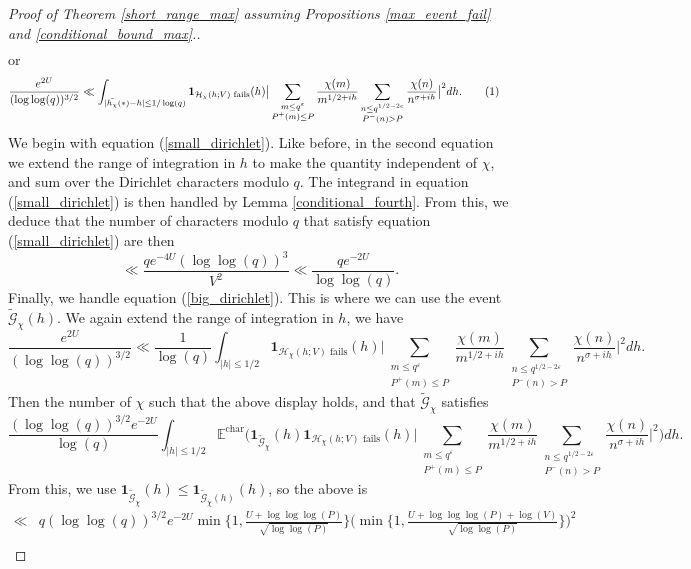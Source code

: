 \documentclass[reqno]{amsart}
\theoremstyle{definition}
\theoremstyle{remark}
\numberwithin{equation}{section}
\newcommand\numberthis{\addtocounter{equation}{1}\tag{\theequation}}
\theoremstyle{remark}
\begin{document}
\begin{proof}[Proof of Theorem \ref{short_range_max} assuming Propositions \ref{max_event_fail} and \ref{conditional_bound_max}.]
\begin{align*}
    \end{align*}
    or
    \begin{align*}
        &\frac{e^{2U}}{(\log\log(q))^{3/2}} \ll \int_{|\tilde{h_\chi}(*)-h| \leq 1/\log(q)}\mathbf{1}_{\mathcal{H}_\chi(h;V) \text{ fails}}(h)\big|\sum_{\substack{m \leq q^\varepsilon \\ P^+(m) \leq P}}\frac{\chi(m)}{m^{1/2+ih}}\sum_{\substack{n \leq q^{1/2-2\varepsilon} \\ P^{-}(n) > P}}\frac{\chi(n)}{n^{\sigma+ih}}\big|^2dh. \numberthis \label{big_dirichlet}
    \end{align*}
    We begin with equation (\ref{small_dirichlet}). Like before, in the second equation we extend the range of integration in $h$ to make the quantity independent of $\chi$, and sum over the Dirichlet characters modulo $q$. The integrand in equation (\ref{small_dirichlet}) is then handled by Lemma \ref{conditional_fourth}. From this, we deduce that the number of characters modulo $q$ that satisfy equation (\ref{small_dirichlet}) are then
    $$\ll \frac{qe^{-4U}(\log\log(q))^3}{V^2} \ll \frac{qe^{-2U}}{\log\log(q)}.$$
    Finally, we handle equation (\ref{big_dirichlet}). This is where we can use the event $\widetilde{\mathcal{G}}_\chi(h)$. We again extend the range of integration in $h$, we have
    $$\frac{e^{2U}}{(\log\log(q))^{3/2}} \ll \frac{1}{\log(q)}\int_{|h| \leq 1/2}\mathbf{1}_{\mathcal{H}_\chi(h;V) \text{ fails}}(h)\big|\sum_{\substack{m \leq q^\varepsilon \\ P^+(m) \leq P}}\frac{\chi(m)}{m^{1/2+ih}}\sum_{\substack{n \leq q^{1/2-2\varepsilon} \\ P^{-}(n) > P}}\frac{\chi(n)}{n^{\sigma+ih}}\big|^2dh.$$
    Then the number of $\chi$ such that the above display holds, and that $\widetilde{\mathcal{G}}_\chi$ satisfies
    $$\frac{(\log\log(q))^{3/2}e^{-2U}}{\log(q)}\int_{|h| \leq 1/2}\mathbb{E}^{\text{char}}\big(\mathbf{1}_{\widetilde{\mathcal{G}}_\chi}(h)\mathbf{1}_{\mathcal{H}_\chi(h;V) \text{ fails}}(h)\big|\sum_{\substack{m \leq q^\varepsilon \\ P^+(m) \leq P}}\frac{\chi(m)}{m^{1/2+ih}}\sum_{\substack{n \leq q^{1/2-2\varepsilon} \\ P^{-}(n) > P}}\frac{\chi(n)}{n^{\sigma+ih}}\big|^2\big)dh.$$
    From this, we use $\mathbf{1}_{\widetilde{\mathcal{G}}_\chi}(h) \leq \mathbf{1}_{\widetilde{\mathcal{G}}_\chi(h)}(h)$, so the above is
    \begin{align*}
        \ll& q(\log\log(q))^{3/2}e^{-2U}\min\big\{1,\frac{U+\log\log\log(P)}{\sqrt{\log\log(P)}}\big\}\big(\min\big\{1,\frac{U+\log\log\log(P)+\log(V)}{\sqrt{\log\log(P)}}\big\}\big)^2 \\

\end{align*}
\end{proof}
\end{document}
